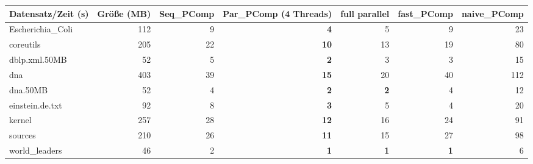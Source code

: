 \documentclass[10pt,a4paper]{standalone}
\begin{document}
	
	
	\begin{tabular}{l|r|r|r|r|r|r}
		Datensatz/Zeit (s) & Größe (MB) & Seq\_PComp & Par\_PComp (4 Threads) & full parallel & fast\_PComp & naive\_PComp \\ \hline
  Escherichia\_Coli & 112 &  9 &  \textbf{4} &          5 &          9 &  23 \\
          coreutils & 205 & 22 & \textbf{10} &         13 &         19 &  80 \\
      dblp.xml.50MB &  52 &  5 &  \textbf{2} &          3 &          3 &  15 \\
                dna & 403 & 39 & \textbf{15} &         20 &         40 & 112 \\
           dna.50MB &  52 &  4 &  \textbf{2} & \textbf{2} &          4 &  12 \\
    einstein.de.txt &  92 &  8 &  \textbf{3} &          5 &          4 &  20 \\
             kernel & 257 & 28 & \textbf{12} &         16 &         24 &  91 \\
            sources & 210 & 26 & \textbf{11} &         15 &         27 &  98 \\
     world\_leaders &  46 &  2 &  \textbf{1} & \textbf{1} & \textbf{1} &   6 \\
	\end{tabular}
\end{document}
